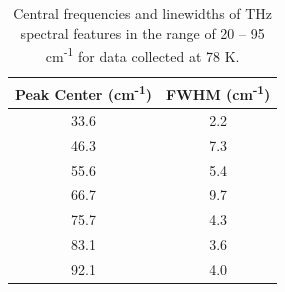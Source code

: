 \begin{table}[htbp]
\centering
\caption{Central frequencies and linewidths of THz spectral features in the range of 20 – 95 cm\textsuperscript{-1} for data collected at 78 K.}
\begin{tabular}{cc}
\textbf{Peak Center (cm\textsuperscript{-1})} & \textbf{FWHM (cm\textsuperscript{-1})} \\
\hline
33.6 & 2.2 \\
46.3 & 7.3 \\
55.6 & 5.4 \\
66.7 & 9.7 \\
75.7 & 4.3 \\
83.1 & 3.6 \\
92.1 & 4.0 \\	
\hline
\end{tabular}
\label{thz_peaks}
\end{table}

